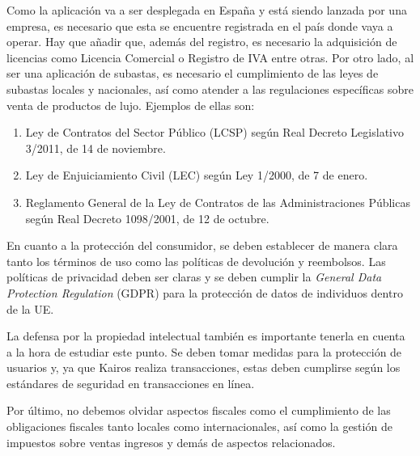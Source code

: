 	Como la aplicación va a ser desplegada en España y está siendo lanzada por una empresa, es necesario que esta se encuentre registrada en el país donde vaya a operar. Hay que añadir que, además del registro, es necesario la adquisición de licencias como Licencia Comercial o Registro de IVA entre otras. Por otro lado, al ser una aplicación de subastas, es necesario el cumplimiento de las leyes de subastas locales y nacionales, así como atender a las regulaciones específicas sobre venta de productos de lujo. Ejemplos de ellas son:
	\begin{enumerate}
		\item Ley de Contratos del Sector Público (LCSP) según Real Decreto Legislativo 3/2011, de 14 de noviembre. \cite{leySectorPublico}
		\item Ley de Enjuiciamiento Civil (LEC) según Ley 1/2000, de 7 de enero. \cite{leyEnjuiciamiento}
		\item Reglamento General de la Ley de Contratos de las Administraciones Públicas según Real Decreto 1098/2001, de 12 de octubre. \cite{leyContratos}
	\end{enumerate}
	
	En cuanto a la protección del consumidor, se deben establecer de manera clara tanto los términos de uso como las políticas de devolución y reembolsos. Las políticas de privacidad deben ser claras y se deben cumplir la \emph{General Data Protection Regulation} (GDPR) para la protección de datos de individuos dentro de la UE. \cite{RGPD}
	
	La defensa por la propiedad intelectual también es importante tenerla en cuenta a la hora de estudiar este punto. Se deben tomar medidas para la protección de usuarios y, ya que Kairos realiza transacciones, estas deben cumplirse según los estándares de seguridad en transacciones en línea.
	
	Por último, no debemos olvidar aspectos fiscales como el cumplimiento de las obligaciones fiscales tanto locales como internacionales, así como la gestión de impuestos sobre ventas ingresos y demás de aspectos relacionados.	


